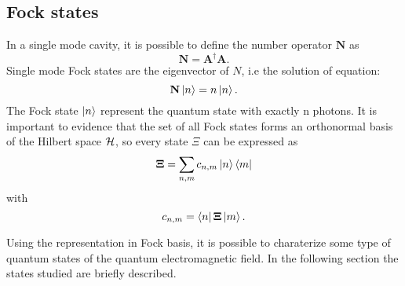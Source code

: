     \subsection{Fock states}
        In a single mode cavity, it is possible to define the number operator $\mathbf{N}$ as
        \begin{equation}
            \mathbf{N}=\mathbf{A}^\dagger \mathbf{A}.
        \end{equation}
        Single mode Fock states are the eigenvector of $N$, i.e the solution of equation:
        \begin{equation}
            \mathbf{N}\ket{n}=n\ket{n}.
        \end{equation}
        The Fock state $\ket{n}$ represent the quantum state with exactly n photons.
        It is important to evidence that the set of all Fock states forms an orthonormal basis
        of the Hilbert space $\mathcal{H}$, so every state $\Xi$ can be expressed as
        \begin{equation}
            \mathbf{\Xi} = \sum_{n,m} c_{n,m}\ket{n}\bra{m}
            \label{eq:QEF.4}
        \end{equation}
        with
        \begin{equation*}
            c_{n,m}=\bra{n}\mathbf{\Xi}\ket{m}.
        \end{equation*}

        Using the representation in Fock basis, it is possible to charaterize some type of quantum 
        states of the quantum electromagnetic field. In the following section the states studied 
        are briefly described.